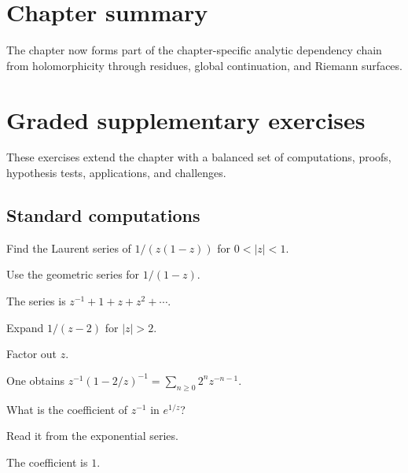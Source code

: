 \section*{Chapter summary}
The chapter now forms part of the chapter-specific analytic dependency chain from holomorphicity through residues, global continuation, and Riemann surfaces.
\section{Graded supplementary exercises}
These exercises extend the chapter with a balanced set of computations, proofs, hypothesis tests, applications, and challenges.

\subsection*{Standard computations}

\begin{exercise}\label{exr:iv08-expand-01}
Find the Laurent series of \(1/(z(1-z))\) for \(0<|z|<1\).
\end{exercise}
\begin{hint}
Use the geometric series for \(1/(1-z)\).
\end{hint}
\begin{solution}
The series is \(z^{-1}+1+z+z^2+\cdots\).
\end{solution}

\begin{exercise}\label{exr:iv08-expand-02}
Expand \(1/(z-2)\) for \(|z|>2\).
\end{exercise}
\begin{hint}
Factor out \(z\).
\end{hint}
\begin{solution}
One obtains \(z^{-1}(1-2/z)^{-1}=\sum_{n\ge0}2^n z^{-n-1}\).
\end{solution}

\begin{exercise}\label{exr:iv08-expand-03}
What is the coefficient of \(z^{-1}\) in \(e^{1/z}\)?
\end{exercise}
\begin{hint}
Read it from the exponential series.
\end{hint}
\begin{solution}
The coefficient is \(1\).
\end{solution}

